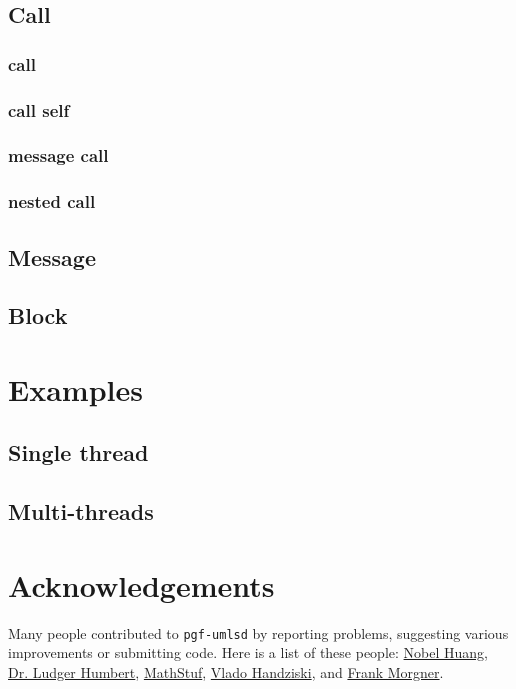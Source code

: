 \documentclass{article}
\newcommand{\demo}[2][1]{
\begin{minipage}{.49\linewidth}
\centering
\resizebox{#1\linewidth}{!}{

}
\end{minipage}
\hspace{0.01\linewidth}
\begin{minipage}{.5\linewidth}

\end{minipage}
}
\newcommand{\example}[2][1]{
  \begin{center}  
    \resizebox{#1\linewidth}{!}{
      
    }
  \end{center}
  
}
\begin{document}
\demo{customize}


\subsection{Call}
\subsubsection{call}
\demo[0.6]{call}

\subsubsection{call self}
\demo[0.6]{callself}

\subsubsection{message call}
\demo[0.6]{messcall}

\subsubsection{nested call}
\demo[0.6]{nested-call}

\subsection{Message}
\demo[0.6]{message}

\subsection{Block}
\demo[0.6]{block}

\section{Examples}
\subsection{Single thread}
\example[0.8]{single-thread-example}

\subsection{Multi-threads}
\example[0.8]{multi-threads-example}

\section{Acknowledgements}
Many people contributed to \texttt{pgf-umlsd} by reporting problems,
suggesting various improvements or submitting code. Here is a list of
these people:
\href{mailto:nobel1984@gmail.com}{Nobel Huang},
\href{mailto:humbert@uni-wuppertal.de}{Dr. Ludger Humbert},
\href{mailto:MathStuf@gmail.com}{MathStuf},
\href{mailto:vlado.handziski@gmail.com}{Vlado Handziski},
and \href{mailto:frankmorgner@gmail.com}{Frank Morgner}.
\end{document}
